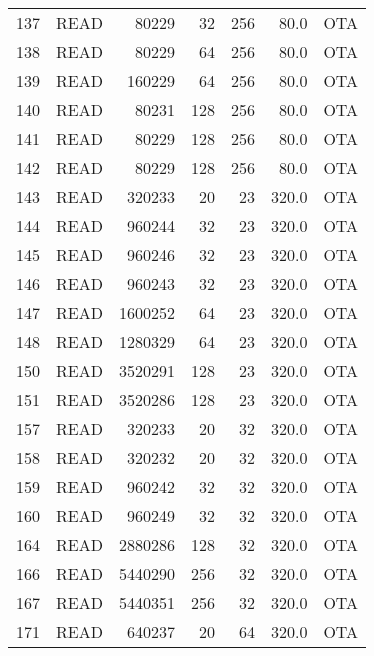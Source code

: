 \begin{longtable}{llrrrrl}
137 &         READ &     80229 &         32 &       256 &           80.0 &  OTA \\
138 &         READ &     80229 &         64 &       256 &           80.0 &  OTA \\
139 &         READ &    160229 &         64 &       256 &           80.0 &  OTA \\
140 &         READ &     80231 &        128 &       256 &           80.0 &  OTA \\
141 &         READ &     80229 &        128 &       256 &           80.0 &  OTA \\
142 &         READ &     80229 &        128 &       256 &           80.0 &  OTA \\
143 &         READ &    320233 &         20 &        23 &          320.0 &  OTA \\
144 &         READ &    960244 &         32 &        23 &          320.0 &  OTA \\
145 &         READ &    960246 &         32 &        23 &          320.0 &  OTA \\
146 &         READ &    960243 &         32 &        23 &          320.0 &  OTA \\
147 &         READ &   1600252 &         64 &        23 &          320.0 &  OTA \\
148 &         READ &   1280329 &         64 &        23 &          320.0 &  OTA \\
150 &         READ &   3520291 &        128 &        23 &          320.0 &  OTA \\
151 &         READ &   3520286 &        128 &        23 &          320.0 &  OTA \\
157 &         READ &    320233 &         20 &        32 &          320.0 &  OTA \\
158 &         READ &    320232 &         20 &        32 &          320.0 &  OTA \\
159 &         READ &    960242 &         32 &        32 &          320.0 &  OTA \\
160 &         READ &    960249 &         32 &        32 &          320.0 &  OTA \\
164 &         READ &   2880286 &        128 &        32 &          320.0 &  OTA \\
166 &         READ &   5440290 &        256 &        32 &          320.0 &  OTA \\
167 &         READ &   5440351 &        256 &        32 &          320.0 &  OTA \\
171 &         READ &    640237 &         20 &        64 &          320.0 &  OTA \\

\end{longtable}
